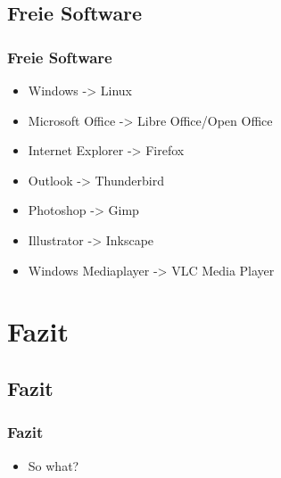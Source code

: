 \documentclass{beamer}
\begin{document}
\subsection{Freie Software}

\begin{frame}
  \frametitle{Freie Software}
  \begin{itemize}
    \item Windows -> Linux
    \item Microsoft Office -> Libre Office/Open Office
    \item Internet Explorer -> Firefox
    \item Outlook -> Thunderbird
    \item Photoshop -> Gimp
    \item Illustrator -> Inkscape
    \item Windows Mediaplayer -> VLC Media Player
  \end{itemize}
\end{frame}

\section{Fazit}

\subsection{Fazit}

\begin{frame}
  \frametitle{Fazit}
  \begin{itemize}
    \item So what?
  \end{itemize}
\end{frame}
\end{document}
